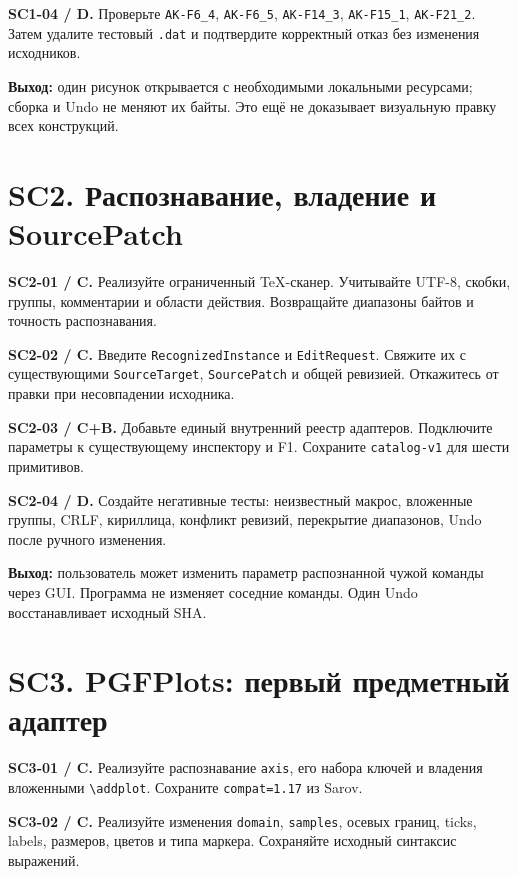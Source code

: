 \documentclass[11pt,a4paper,oneside]{scrreprt}
\begin{document}
\textbf{SC1-04 / D.} Проверьте \texttt{AK-F6\_4}, \texttt{AK-F6\_5}, \texttt{AK-F14\_3}, \texttt{AK-F15\_1}, \texttt{AK-F21\_2}. Затем удалите тестовый \texttt{.dat} и подтвердите корректный отказ без изменения исходников.

\textbf{Выход:} один рисунок открывается с необходимыми локальными ресурсами; сборка и Undo не меняют их байты. Это ещё не доказывает визуальную правку всех конструкций.

\section{SC2. Распознавание, владение и SourcePatch}\label{sc2.-ux440ux430ux441ux43fux43eux437ux43dux430ux432ux430ux43dux438ux435-ux432ux43bux430ux434ux435ux43dux438ux435-ux438-sourcepatch}

\textbf{SC2-01 / C.} Реализуйте ограниченный TeX-сканер. Учитывайте UTF-8, скобки, группы, комментарии и области действия. Возвращайте диапазоны байтов и точность распознавания.

\textbf{SC2-02 / C.} Введите \texttt{RecognizedInstance} и \texttt{EditRequest}. Свяжите их с существующими \texttt{SourceTarget}, \texttt{SourcePatch} и общей ревизией. Откажитесь от правки при несовпадении исходника.

\textbf{SC2-03 / C+B.} Добавьте единый внутренний реестр адаптеров. Подключите параметры к существующему инспектору и F1. Сохраните \texttt{catalog-v1} для шести примитивов.

\textbf{SC2-04 / D.} Создайте негативные тесты: неизвестный макрос, вложенные группы, CRLF, кириллица, конфликт ревизий, перекрытие диапазонов, Undo после ручного изменения.

\textbf{Выход:} пользователь может изменить параметр распознанной чужой команды через GUI. Программа не изменяет соседние команды. Один Undo восстанавливает исходный SHA.

\section{SC3. PGFPlots: первый предметный адаптер}\label{sc3.-pgfplots-ux43fux435ux440ux432ux44bux439-ux43fux440ux435ux434ux43cux435ux442ux43dux44bux439-ux430ux434ux430ux43fux442ux435ux440}

\textbf{SC3-01 / C.} Реализуйте распознавание \texttt{axis}, его набора ключей и владения вложенными \texttt{\textbackslash{}addplot}. Сохраните \texttt{compat=1.17} из Sarov.

\textbf{SC3-02 / C.} Реализуйте изменения \texttt{domain}, \texttt{samples}, осевых границ, ticks, labels, размеров, цветов и типа маркера. Сохраняйте исходный синтаксис выражений.
\end{document}
